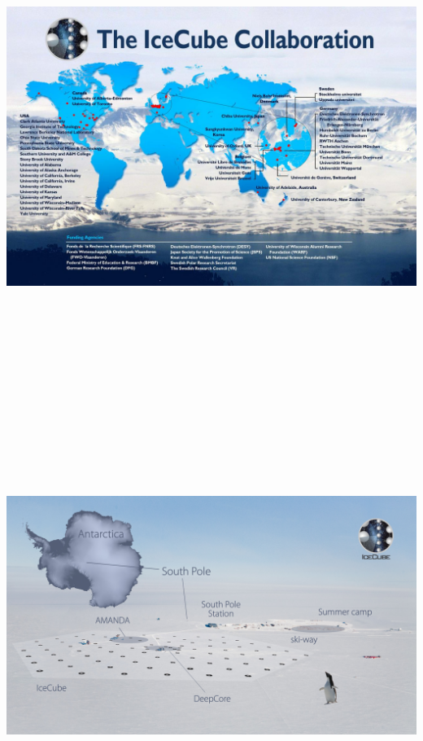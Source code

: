\onecolumn
\begin{center}
\includegraphics[keepaspectratio,height=15cm]{icecube-collab}
\end{center}

\Tr
\begin{center}
\includegraphics[keepaspectratio,height=14.5cm]{pole-view}
\end{center}


